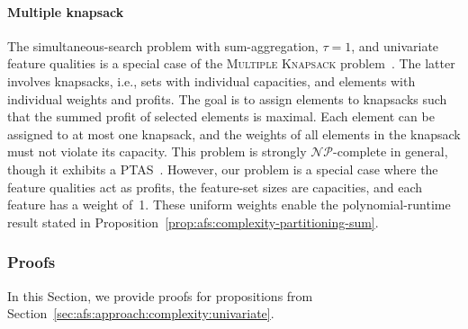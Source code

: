 \documentclass{article}
\theoremstyle{definition}
\begin{document}
\paragraph{Multiple knapsack}

The simultaneous-search problem with sum-aggregation, $\tau=1$, and univariate feature qualities is a special case of the \textsc{Multiple Knapsack} problem~\cite{chekuri2005polynomial}.
The latter involves knapsacks, i.e., sets with individual capacities, and elements with individual weights and profits.
The goal is to assign elements to knapsacks such that the summed profit of selected elements is maximal.
Each element can be assigned to at most one knapsack, and the weights of all elements in the knapsack must not violate its capacity.
This problem is strongly $\mathcal{NP}$-complete in general, though it exhibits a PTAS~\cite{chekuri2005polynomial}.
However, our problem is a special case where the feature qualities act as profits, the feature-set sizes are capacities, and each feature has a weight of~1.
These uniform weights enable the polynomial-runtime result stated in Proposition~\ref{prop:afs:complexity-partitioning-sum}.

\subsubsection{Proofs}
\label{sec:afs:appendix:complexity:proofs}

In this Section, we provide proofs for propositions from Section~\ref{sec:afs:approach:complexity:univariate}.
\end{document}
